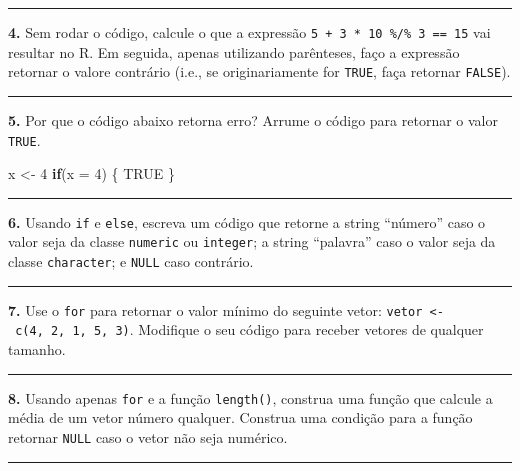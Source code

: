 \documentclass[
]{book}
\newenvironment{Shaded}{\begin{snugshade}}{\end{snugshade}}
\newcommand{\ControlFlowTok}[1]{\textcolor[rgb]{0.13,0.29,0.53}{\textbf{#1}}}
\newcommand{\DataTypeTok}[1]{\textcolor[rgb]{0.13,0.29,0.53}{#1}}
\newcommand{\DecValTok}[1]{\textcolor[rgb]{0.00,0.00,0.81}{#1}}
\newcommand{\NormalTok}[1]{#1}
\newcommand{\OtherTok}[1]{\textcolor[rgb]{0.56,0.35,0.01}{#1}}
\newcommand{\StringTok}[1]{\textcolor[rgb]{0.31,0.60,0.02}{#1}}
\begin{document}
\begin{center}\rule{0.5\linewidth}{0.5pt}\end{center}

\textbf{4.} Sem rodar o código, calcule o que a expressão \texttt{5\ +\ 3\ *\ 10\ \%/\%\ 3\ ==\ 15} vai resultar no R. Em seguida, apenas utilizando parênteses, faço a expressão retornar o valore contrário (i.e., se originariamente for \texttt{TRUE}, faça retornar \texttt{FALSE}).

\begin{center}\rule{0.5\linewidth}{0.5pt}\end{center}

\textbf{5.} Por que o código abaixo retorna erro? Arrume o código para retornar o valor \texttt{TRUE}.

\begin{Shaded}
\begin{Highlighting}[]
\NormalTok{x <-}\StringTok{ }\DecValTok{4}
\ControlFlowTok{if}\NormalTok{(}\DataTypeTok{x =} \DecValTok{4}\NormalTok{) \{}
  \OtherTok{TRUE}
\NormalTok{\}}
\end{Highlighting}
\end{Shaded}

\begin{center}\rule{0.5\linewidth}{0.5pt}\end{center}

\textbf{6.} Usando \texttt{if} e \texttt{else}, escreva um código que retorne a string ``número'' caso o valor seja da classe \texttt{numeric} ou \texttt{integer}; a string ``palavra'' caso o valor seja da classe \texttt{character}; e \texttt{NULL} caso contrário.

\begin{center}\rule{0.5\linewidth}{0.5pt}\end{center}

\textbf{7.} Use o \texttt{for} para retornar o valor mínimo do seguinte vetor: \texttt{vetor\ \textless{}-\ c(4,\ 2,\ 1,\ 5,\ 3)}. Modifique o seu código para receber vetores de qualquer tamanho.

\begin{center}\rule{0.5\linewidth}{0.5pt}\end{center}

\textbf{8.} Usando apenas \texttt{for} e a função \texttt{length()}, construa uma função que calcule a média de um vetor número qualquer. Construa uma condição para a função retornar \texttt{NULL} caso o vetor não seja numérico.

\begin{center}\rule{0.5\linewidth}{0.5pt}\end{center}
\end{document}
